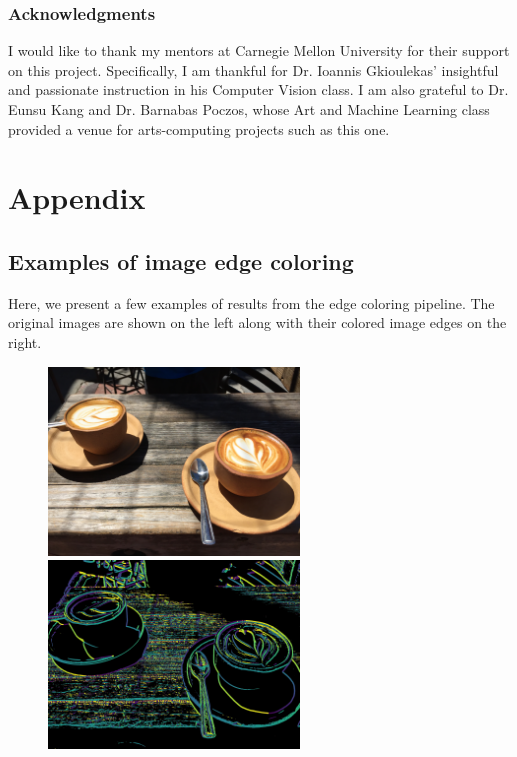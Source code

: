 \documentclass{article}
\begin{document}
\subsubsection*{Acknowledgments}

I would like to thank my mentors at Carnegie Mellon University for their support on this project. Specifically, I am thankful for Dr. Ioannis Gkioulekas' insightful and passionate instruction in his Computer Vision class. I am also grateful to Dr. Eunsu Kang and Dr. Barnabas Poczos, whose Art and Machine Learning class provided a venue for arts-computing projects such as this one.



\section{Appendix}

\subsection{Examples of image edge coloring}

Here, we present a few examples of results from the edge coloring pipeline. The original images are shown on the left along with their colored image edges on the right.

\begin{figure}[h!]
\centering
\includegraphics[height=5cm]{images/orig_1.jpg}
\hspace{0.4cm}
\includegraphics[height=5cm]{images/edge_color_1.jpg}
\end{figure}
\end{document}

